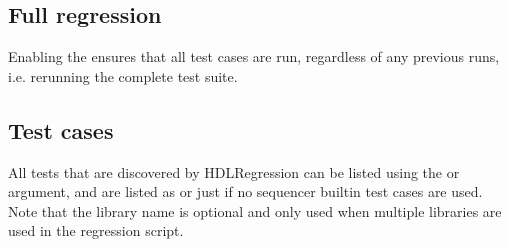 \documentclass[letterpaper,10pt,english]{sphinxmanual}
\let\sphinxpxdimen\pdfpxdimen\else\newdimen\sphinxpxdimen
\begin{document}
\begin{sphinxVerbatim}[commandchars=\\\{\}]
\end{sphinxVerbatim}


\subsection{Full regression}
\label{\detokenize{cli:full-regression}}
\sphinxAtStartPar
Enabling the {\hyperref[\detokenize{intro:what-is-regression-testing}]{}} ensures that all test cases are run, regardless
of any previous runs, i.e. re\sphinxhyphen{}running the complete test suite.

\begin{sphinxVerbatim}[commandchars=\\\{\}]
\end{sphinxVerbatim}

\noindent{\hspace*{\fill}\sphinxincludegraphics[width=750\sphinxpxdimen]{{full_regression}.png}\hspace*{\fill}}


\subsection{Test cases}
\label{\detokenize{cli:test-cases}}
\sphinxAtStartPar
All tests that are discovered by HDLRegression can be listed using the  or  argument, and
are listed as  or just
 if no sequencer built\sphinxhyphen{}in test cases are used. Note that the library
name is optional and only used when multiple libraries are used in the regression script.
\end{document}
